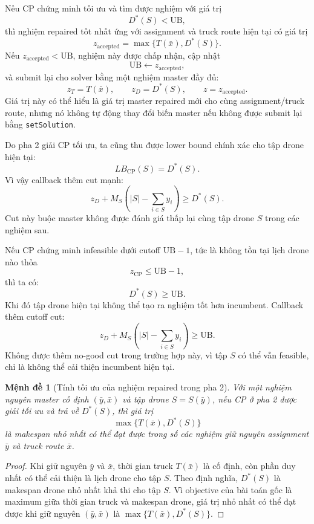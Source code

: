 \documentclass[12pt,a4paper]{article}
\newtheorem{proposition}{Mệnh đề}
\newcommand{\UB}{\mathrm{UB}}
\begin{document}
Nếu CP chứng minh tối ưu và tìm được nghiệm với giá trị
\[
    D^*(S)<\UB,
\]
thì nghiệm repaired tốt nhất ứng với assignment và truck route hiện tại có giá trị
\begin{equation}
    z_{\mathrm{accepted}}
    =
    \max\{T(\bar x),D^*(S)\}.
    \label{eq:accepted-z-phase2}
\end{equation}
Nếu $z_{\mathrm{accepted}}<\UB$, nghiệm này được chấp nhận, cập nhật
\[
    \UB \leftarrow z_{\mathrm{accepted}},
\]
và submit lại cho solver bằng một nghiệm master đầy đủ:
\[
    z_T=T(\bar x),\qquad
    z_D=D^*(S),\qquad
    z=z_{\mathrm{accepted}}.
\]
Giá trị này có thể hiểu là giá trị master repaired mới cho cùng assignment/truck route, nhưng nó không tự động thay đổi biến master nếu không được submit lại bằng \texttt{setSolution}.

Do pha 2 giải CP tối ưu, ta cũng thu được lower bound chính xác cho tập drone hiện tại:
\[
    LB_{\mathrm{CP}}(S)=D^*(S).
\]
Vì vậy callback thêm cut mạnh:
\begin{equation}
    z_D+M_S\left(|S|-\sum_{i\in S}y_i\right)
    \ge D^*(S).
    \label{eq:phase2-optimal-cut}
\end{equation}
Cut này buộc master không được đánh giá thấp lại cùng tập drone $S$ trong các nghiệm sau.

Nếu CP chứng minh infeasible dưới cutoff $\UB-1$, tức là không tồn tại lịch drone nào thỏa
\[
    z_{\mathrm{CP}}\le \UB-1,
\]
thì ta có:
\[
    D^*(S)\ge \UB.
\]
Khi đó tập drone hiện tại không thể tạo ra nghiệm tốt hơn incumbent. Callback thêm cutoff cut:
\begin{equation}
    z_D+M_S\left(|S|-\sum_{i\in S}y_i\right)
    \ge \UB.
    \label{eq:cut-ub}
\end{equation}
Không được thêm no-good cut trong trường hợp này, vì tập $S$ có thể vẫn feasible, chỉ là không thể cải thiện incumbent hiện tại.

\begin{proposition}[Tính tối ưu của nghiệm repaired trong pha 2]
Với một nghiệm nguyên master cố định $(\bar y,\bar x)$ và tập drone $S=S(\bar y)$, nếu CP ở pha 2 được giải tối ưu và trả về $D^*(S)$, thì giá trị
\[
    \max\{T(\bar x),D^*(S)\}
\]
là makespan nhỏ nhất có thể đạt được trong số các nghiệm giữ nguyên assignment $\bar y$ và truck route $\bar x$.
\end{proposition}
\begin{proof}
Khi giữ nguyên $\bar y$ và $\bar x$, thời gian truck $T(\bar x)$ là cố định, còn phần duy nhất có thể cải thiện là lịch drone cho tập $S$. Theo định nghĩa, $D^*(S)$ là makespan drone nhỏ nhất khả thi cho tập $S$. Vì objective của bài toán gốc là maximum giữa thời gian truck và makespan drone, giá trị nhỏ nhất có thể đạt được khi giữ nguyên $(\bar y,\bar x)$ là $\max\{T(\bar x),D^*(S)\}$.
\end{proof}
\end{document}
